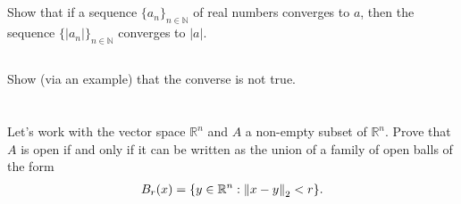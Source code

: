\documentclass[11pt,letterpaper]{article}
\begin{document}
\subsection{} Show that if a sequence $\{a_n\}_{n\in\mathbb{N}}$ of real numbers converges to $a$, then the sequence $\{|a_n|\}_{n\in\mathbb{N}}$ converges to $|a|$. 
\subsection{} Show (via an example) that the converse is not true.

\section{}
Let's work with the vector space $\mathbb{R}^n$ and $A$ a non-empty subset of $\mathbb{R}^n$. Prove that $A$ is open if and only if it can be written as the union of a family of open balls of the form
\begin{align}
    B_r(x) = \{y\in \mathbb{R}^n: \left\Vert x-y \right\Vert_2< r\}. 
\end{align}


\vfill
\printbibliography
\end{document}
